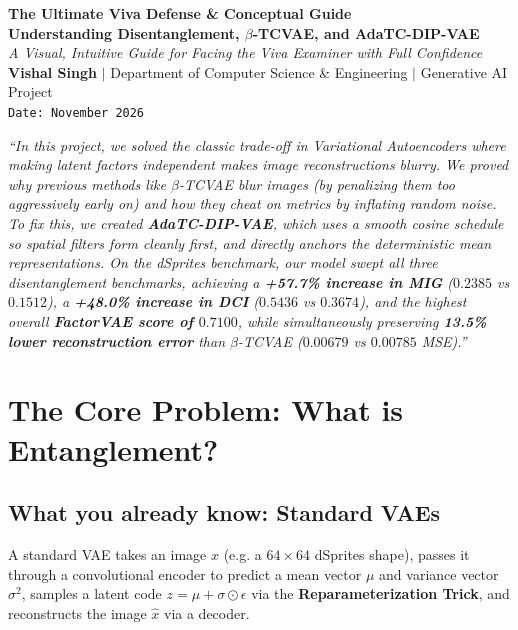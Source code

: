 \documentclass[11pt,a4paper]{article}
\begin{document}
\begin{center}
    {\huge \textbf{The Ultimate Viva Defense \& Conceptual Guide}}\\[0.5em]
    {\Large \textbf{Understanding Disentanglement, $\beta$-TCVAE, and AdaTC-DIP-VAE}}\\[0.4em]
    {\large \textit{A Visual, Intuitive Guide for Facing the Viva Examiner with Full Confidence}}\\[0.6em]
    {\normalsize \textbf{Vishal Singh} $|$ Department of Computer Science \& Engineering $|$ Generative AI Project}\\[0.3em]
    {\small \texttt{Date: November 2026}}
\end{center}

\vspace{0.8em}

\begin{pitchbox}
\textit{``In this project, we solved the classic trade-off in Variational Autoencoders where making latent factors independent makes image reconstructions blurry. We proved why previous methods like $\beta$-TCVAE blur images (by penalizing them too aggressively early on) and how they cheat on metrics by inflating random noise. To fix this, we created \textbf{AdaTC-DIP-VAE}, which uses a smooth cosine schedule so spatial filters form cleanly first, and directly anchors the deterministic mean representations. On the dSprites benchmark, our model swept all three disentanglement benchmarks, achieving a \textbf{+57.7\% increase in MIG} ($0.2385$ vs $0.1512$), a \textbf{+48.0\% increase in DCI} ($0.5436$ vs $0.3674$), and the highest overall \textbf{FactorVAE score of $0.7100$}, while simultaneously preserving \textbf{13.5\% lower reconstruction error} than $\beta$-TCVAE ($0.00679$ vs $0.00785$ MSE).''}
\end{pitchbox}

\vspace{0.8em}

\section{The Core Problem: What is Entanglement?}

\subsection{What you already know: Standard VAEs}
A standard VAE takes an image $x$ (e.g. a $64 \times 64$ dSprites shape), passes it through a convolutional encoder to predict a mean vector $\mu$ and variance vector $\sigma^2$, samples a latent code $z = \mu + \sigma \odot \epsilon$ via the \textbf{Reparameterization Trick}, and reconstructs the image $\hat{x}$ via a decoder.
\end{document}
